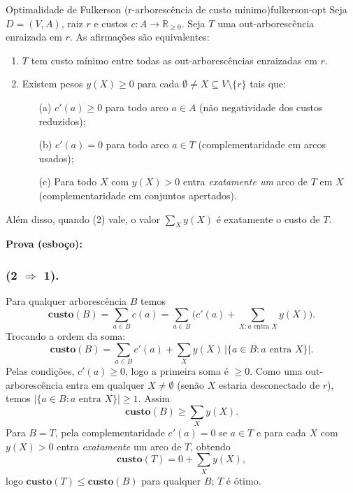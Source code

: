 \begin{teobox}{Optimalidade de Fulkerson (r-arborescência de custo mínimo)}{fulkerson-opt}
	Seja $D=(V,A)$, raiz $r$ e custos $c:A\to\mathbb{R}_{\ge 0}$. Seja $T$ uma out-arborescência enraizada em $r$. As afirmações são equivalentes:
	\begin{enumerate}\setlength{\itemsep}{4pt}
		\item $T$ tem custo mínimo entre todas as out-arborescências enraizadas em $r$.
		\item Existem pesos $y(X)\ge 0$ para cada $\emptyset\neq X\subseteq V\setminus\{r\}$ tais que:
		      \begin{enumerate}\setlength{\itemsep}{2pt}
			      \item[(a)] $c'(a)\ge 0$ para todo arco $a\in A$ (não negatividade dos custos reduzidos);
			      \item[(b)] $c'(a)=0$ para todo arco $a\in T$ (complementaridade em arcos usados);
			      \item[(c)] Para todo $X$ com $y(X)>0$ entra \emph{exatamente um} arco de $T$ em $X$ (complementaridade em conjuntos apertados).
		      \end{enumerate}
	\end{enumerate}
	Além disso, quando (2) vale, o valor $\sum_X y(X)$ é exatamente o custo de $T$.


	\textbf{Prova (esboço):}

	\subsubsection{(2 $\Rightarrow$ 1).} Para qualquer arborescência $B$ temos
	\[
		\textbf{custo}(B) = \sum_{a\in B} c(a) = \sum_{a\in B} \Big( c'(a) + \sum_{X: a\text{ entra }X} y(X) \Big).
	\]
	Trocando a ordem da soma:
	\[
		\textbf{custo}(B) = \sum_{a\in B} c'(a) + \sum_X y(X)\,\big| \{a\in B: a \text{ entra } X\}\big|.
	\]
	Pelas condições, $c'(a)\ge 0$, logo a primeira soma é $\ge 0$. Como uma out-arborescência entra em qualquer $X\neq\emptyset$ (senão $X$ estaria desconectado de $r$), temos $|\{a\in B: a \text{ entra } X\}|\ge 1$. Assim
	\[
		\textbf{custo}(B) \ge \sum_X y(X).
	\]
	Para $B=T$, pela complementaridade $c'(a)=0$ se $a\in T$ e para cada $X$ com $y(X)>0$ entra \emph{exatamente} um arco de $T$, obtendo
	\[
		\textbf{custo}(T) = 0 + \sum_X y(X),
	\]
	logo $\textbf{custo}(T) \le \textbf{custo}(B)$ para qualquer $B$; $T$ é ótimo.


\end{teobox}
